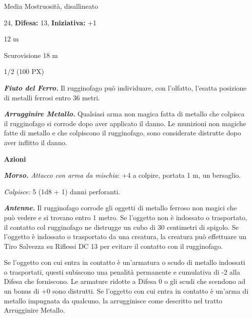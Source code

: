 \begin{multicols}{2}
{
\noindent
\begin{description}[noitemsep, topsep=0pt, parsep=0pt, partopsep=0pt, leftmargin=0cm, labelwidth=2.2cm]
	\item[\textbf{Taglia/Tipo:}] Media Mostruosità, disallineato
	\item[\textbf{Caratt.:}] 
	\item[\textbf{Punti Ferita:}] 24,  \textbf{Difesa:} 13,  \textbf{Iniziativa:} +1
	\item[\textbf{Movimento:}] 12 m
	\item[\textbf{Tiri Salvez.:}] 
	\item[\textbf{Sensi:}] Scurovisione 18 m
	\item[\textbf{Sfida:}] 1/2 (100 PX)\smallskip
\end{description}

\emph{\textbf{Fiuto del Ferro.}} Il rugginofago può individuare, con l'olfatto, l'esatta posizione di metalli ferrosi entro 36 metri.

\emph{\textbf{Arrugginire Metallo.}} Qualsiasi arma non magica fatta di metallo che colpisca il rugginofago si corrode dopo aver applicato il danno. Le munizioni non magiche fatte di metallo e che colpiscono il rugginofago, sono considerate distrutte dopo aver inflitto il danno.

\textbf{Azioni}

\emph{\textbf{Morso.} Attacco con arma da mischia}: +4 a colpire, portata 1 m, un bersaglio.

\emph{Colpisce:} 5 (1d8 + 1) danni perforanti.

\emph{\textbf{Antenne.}} Il rugginofago corrode gli oggetti di metallo ferroso non magici che può vedere e si trovano entro 1 metro. Se l'oggetto non è indossato o trasportato, il contatto col rugginofago ne distrugge un cubo di 30 centimetri di spigolo. Se l'oggetto è indossato o trasportato da una creatura, la creatura può effettuare un Tiro Salvezza su Riflessi DC 13 per evitare il contatto con il rugginofago.

Se l'oggetto con cui entra in contatto è un'armatura o scudo di metallo indossati o trasportati, questi subiscono una penalità permanente e cumulativa di -2 alla Difesa che forniscono. Le armature ridotte a Difesa 0 o gli scudi che scendono ad un bonus di +0 sono distrutti. Se l'oggetto con cui entra in contatto è un'arma di metallo impugnata da qualcuno, la arrugginisce come descritto nel tratto Arrugginire Metallo.

}
\end{multicols}
